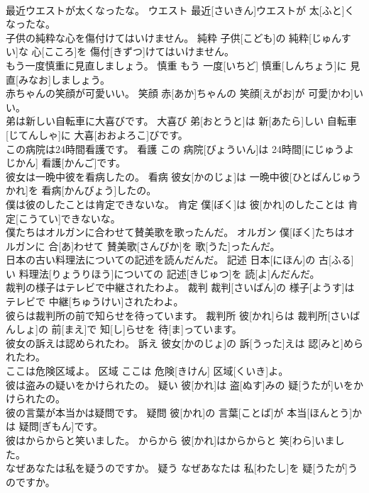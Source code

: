 \documentclass[8pt]{extreport}
\begin{document}
\begin{CJK}{UTF8}{min}
\\	最近ウエストが太くなったな。	ウエスト	最近[さいきん]ウエストが 太[ふと]くなったな。	
\\	子供の純粋な心を傷付けてはいけません。	純粋	子供[こども]の 純粋[じゅんすい]な 心[こころ]を 傷付[きずつ]けてはいけません。	
\\	もう一度慎重に見直しましょう。	慎重	もう 一度[いちど] 慎重[しんちょう]に 見直[みなお]しましょう。	
\\	赤ちゃんの笑顔が可愛いい。	笑顔	赤[あか]ちゃんの 笑顔[えがお]が 可愛[かわ]いい。	
\\	弟は新しい自転車に大喜びです。	大喜び	弟[おとうと]は 新[あたら]しい 自転車[じてんしゃ]に 大喜[おおよろこ]びです。	
\\	この病院は24時間看護です。	看護	この 病院[びょういん]は 24時間[にじゅうよじかん] 看護[かんご]です。	
\\	彼女は一晩中彼を看病したの。	看病	彼女[かのじょ]は 一晩中彼[ひとばんじゅう かれ]を 看病[かんびょう]したの。	
\\	僕は彼のしたことは肯定できないな。	肯定	僕[ぼく]は 彼[かれ]のしたことは 肯定[こうてい]できないな。	
\\	僕たちはオルガンに合わせて賛美歌を歌ったんだ。	オルガン	僕[ぼく]たちはオルガンに 合[あ]わせて 賛美歌[さんびか]を 歌[うた]ったんだ。	
\\	日本の古い料理法についての記述を読んだんだ。	記述	日本[にほん]の 古[ふる]い 料理法[りょうりほう]についての 記述[きじゅつ]を 読[よ]んだんだ。	
\\	裁判の様子はテレビで中継されたわよ。	裁判	裁判[さいばん]の 様子[ようす]はテレビで 中継[ちゅうけい]されたわよ。	
\\	彼らは裁判所の前で知らせを待っています。	裁判所	彼[かれ]らは 裁判所[さいばんしょ]の 前[まえ]で 知[し]らせを 待[ま]っています。	
\\	彼女の訴えは認められたわ。	訴え	彼女[かのじょ]の 訴[うった]えは 認[みと]められたわ。	
\\	ここは危険区域よ。	区域	ここは 危険[きけん] 区域[くいき]よ。	
\\	彼は盗みの疑いをかけられたの。	疑い	彼[かれ]は 盗[ぬす]みの 疑[うたが]いをかけられたの。	
\\	彼の言葉が本当かは疑問です。	疑問	彼[かれ]の 言葉[ことば]が 本当[ほんとう]かは 疑問[ぎもん]です。	
\\	彼はからからと笑いました。	からから	彼[かれ]はからからと 笑[わら]いました。	
\\	なぜあなたは私を疑うのですか。	疑う	なぜあなたは 私[わたし]を 疑[うたが]うのですか。	

\end{CJK}
\end{document}
